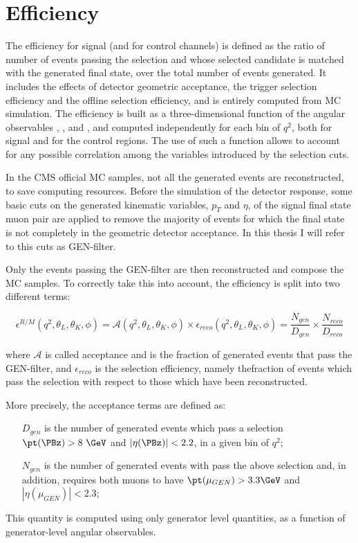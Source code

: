 \section{Efficiency}\label{sec:eff}

The efficiency for signal (and for control channels) is defined as the ratio of number of events passing the selection and whose selected candidate is matched with the generated final state, over the total number of events generated.
It includes the effects of detector geometric acceptance, the trigger selection efficiency and the offline selection efficiency, and is entirely computed from MC simulation.
The efficiency is built as a three-dimensional function of the angular observables \TL, \TK, and \PHI, and computed independently for each bin of $q^2$, both for signal and for the control regions.
The use of such a function allows to account for any possible correlation among the variables introduced by the selection cuts.

In the CMS official MC samples, not all the generated events are reconstructed, to save computing resources. Before the simulation of the detector response, some basic cuts on the generated kinematic variables, $p_T$ and $\eta$, of the signal final state muon pair are applied to remove the majority of events for which the final state is not completely in the geometric detector acceptance. In this thesis I will refer to this cuts as GEN-filter.

Only the events passing the GEN-filter are then reconstructed and compose the MC samples. To correctly take this into account, the efficiency is split into two different terms: 

\begin{equation}\label{eq:eff}
    \epsilon^{R/M}(q^2,\theta_L,\theta_K,\phi)=\mathcal{A}(q^2,\theta_L,\theta_K,\phi)\times\epsilon_{reco}(q^2,\theta_L,\theta_K,\phi)= \frac{N_{gen}}{D_{gen}}\times\frac{N_{reco}}{D_{reco}}
\end{equation}

where $\mathcal{A}$ is called acceptance and is the fraction of generated events that pass the GEN-filter, and $\epsilon_{reco}$ is the selection efficiency, namely thefraction of events which pass the selection with respect to those which have been reconstructed.

More precisely, the acceptance terms are defined as:
\begin{itemize}
    \item[$D_{gen}$] is the number of generated events which pass a selection $\pt(\PBz)>8~\GeV$ and $|\eta(\PBz)|<2.2$, in a given bin of $q^2$;
    \item[$N_{gen}$] is the number of generated events with pass the above selection and, in addition, requires both muons to have $\pt(\mu_{GEN})>3.3\GeV$ and $|\eta(\mu_{GEN})|<2.3$;
\end{itemize}
This quantity is computed using only generator level quantities, as a function of generator-level angular observables. %

